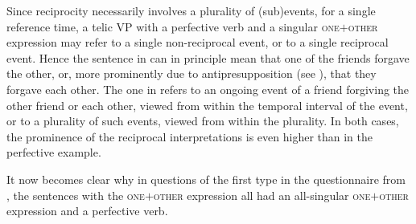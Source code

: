 \documentclass[output=paper,colorlinks,citecolor=brown]{langscibook}
\begin{document}
\label{Jovan1-b} 

\label{Jovan1-c}
\z \z

\noindent Since reciprocity necessarily involves a plurality of (sub)events, for a single reference time, a telic VP with a perfective verb and a singular \textsc{one$+$other} expression may refer to a single non-reciprocal event, or to a single reciprocal event. Hence the sentence in  can in principle mean that one of the friends forgave the other, or, more prominently due to antipresupposition (see ), that they forgave each other. The one in  refers to an ongoing event of a friend forgiving the other friend or each other, viewed from within the temporal interval of the event, or to a plurality of such events, viewed from within the plurality. In both cases, the prominence of the reciprocal interpretations is even higher than in the perfective example.

\ea\label{Drugovi} 
\label{Drugovi-a}

\label{Drugovi-b}
 \z \z

\noindent It now becomes clear why in questions of the first type in the questionnaire from , the sentences with the \textsc{one$+$other} expression all had an all-singular \textsc{one$+$other} expression and a perfective verb.
\end{document}

